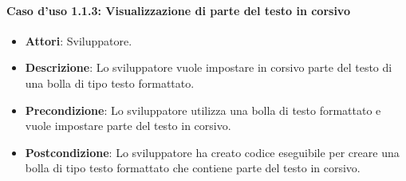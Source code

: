 \paragraph{Caso d'uso 1.1.3: Visualizzazione di parte del testo in corsivo}
\begin{itemize}
\item\textbf{Attori}: Sviluppatore.
\item\textbf{Descrizione}: Lo sviluppatore vuole impostare in corsivo parte del testo di una bolla di tipo testo formattato.
\item\textbf{Precondizione}: Lo sviluppatore utilizza una bolla di testo formattato e vuole impostare parte del testo in corsivo.
\item\textbf{Postcondizione}: Lo sviluppatore ha creato codice eseguibile per creare una bolla di tipo testo formattato che contiene parte del testo in corsivo.
\end{itemize}